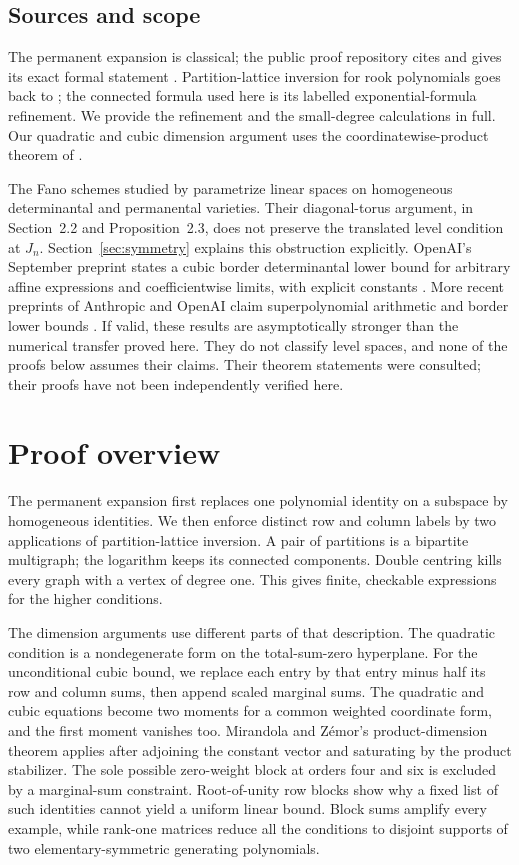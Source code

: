 \documentclass[11pt]{article}
\theoremstyle{definition}
\theoremstyle{remark}
\begin{document}
\subsection{Sources and scope}
The permanent expansion is classical; the public proof repository cites \citet{Minc} and gives its exact formal statement \citep{FleetExpansion}. Partition-lattice inversion for rook polynomials goes back to \citet{GJW}; the connected formula used here is its labelled exponential-formula refinement. We provide the refinement and the small-degree calculations in full. Our quadratic and cubic dimension argument uses the coordinatewise-product theorem of \citet[Theorem~3.3, preprint p.~7]{MZ}.

The Fano schemes studied by \citet{CI} parametrize linear spaces on homogeneous determinantal and permanental varieties. Their diagonal-torus argument, in Section~2.2 and Proposition~2.3, does not preserve the translated level condition at $J_n$. Section~\ref{sec:symmetry} explains this obstruction explicitly.
OpenAI's September preprint states a cubic border determinantal lower bound for arbitrary affine expressions and coefficientwise limits, with explicit constants \citep[Theorem~1.1, p.~2]{OpenAICubic}. More recent preprints of Anthropic and OpenAI claim superpolynomial arithmetic and border lower bounds \citep{Anthropic,OpenAI}. If valid, these results are asymptotically stronger than the numerical transfer proved here. They do not classify level spaces, and none of the proofs below assumes their claims. Their theorem statements were consulted; their proofs have not been independently verified here.

\section{Proof overview}
The permanent expansion first replaces one polynomial identity on a subspace by homogeneous identities. We then enforce distinct row and column labels by two applications of partition-lattice inversion. A pair of partitions is a bipartite multigraph; the logarithm keeps its connected components. Double centring kills every graph with a vertex of degree one. This gives finite, checkable expressions for the higher conditions.

The dimension arguments use different parts of that description. The quadratic condition is a nondegenerate form on the total-sum-zero hyperplane. For the unconditional cubic bound, we replace each entry by that entry minus half its row and column sums, then append scaled marginal sums. The quadratic and cubic equations become two moments for a common weighted coordinate form, and the first moment vanishes too. Mirandola and Z\'emor's product-dimension theorem applies after adjoining the constant vector and saturating by the product stabilizer. The sole possible zero-weight block at orders four and six is excluded by a marginal-sum constraint. Root-of-unity row blocks show why a fixed list of such identities cannot yield a uniform linear bound. Block sums amplify every example, while rank-one matrices reduce all the conditions to disjoint supports of two elementary-symmetric generating polynomials.
\end{document}
